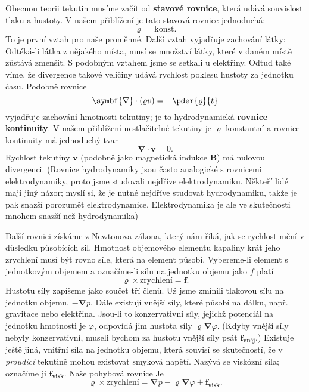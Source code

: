     Obecnou teorii tekutin musíme začít od \textbf{stavové rovnice}, která udává souvislost tlaku a 
    hustoty. V našem přiblížení je tato stavová rovnice jednoduchá:
    \begin{equation*}
      \varrho = \text{konst}.
    \end{equation*}
    To je první vztah pro naše proměnné. Další vztah vyjadřuje zachování látky: Odtéká-li látka z 
    nějakého místa, musí se množství látky, které v daném místě zůstává zmenšit. S podobným vztahem 
    jsme se setkali u elektřiny. Odtud také víme, že divergence takové veličiny udává rychlost 
    poklesu hustoty za jednotku času. Podobně rovnice
    \begin{equation}\label{fyz:eq547}
      \symbf{\nabla}\cdot(\varrho v) = -\pder{\varrho}{t}
    \end{equation}
    vyjadřuje zachování hmotnosti tekutiny; je to hydrodynamická \textbf{rovnice kontinuity}. V 
    našem přiblížení nestlačitelné tekutiny je \(\varrho\) konstantní a rovnice kontinuity má 
    jednoduchý tvar
    \begin{equation}\label{fyz:eq548}
      \symbf{\nabla}\cdot\bm{v} = 0.
    \end{equation}
    Rychlost tekutiny \(\bm{v}\) (podobně jako magnetická indukce \(\bm{B}\)) má nulovou 
    divergenci. (Rovnice hydrodynamiky jsou často analogické s rovnicemi elektrodynamiky, proto 
    jsme studovali nejdříve elektrodynamiku. Někteří lidé mají jiný názor; myslí si, že je nutné 
    nejdříve studovat hydrodynamiku, takže je pak snazší porozumět elektrodynamice. Elektrodynamika 
    je ale ve skutečnosti mnohem snazší než hydrodynamika)
    
    Další rovnici získáme z Newtonova zákona, který nám říká, jak se rychlost mění v důsledku 
    působících sil. Hmotnost objemového elementu kapaliny krát jeho zrychlení musí být rovno síle, 
    která na element působí. Vybereme-li element s jednotkovým objemem a označíme-li sílu na 
    jednotku objemu jako \(f\) platí
    \begin{equation*}
      \varrho\times\text{zrychlení} = \bm{f}.
    \end{equation*}
    Hustotu síly zapíšeme jako součet tří členů. Už jsme zmínili tlakovou sílu na jednotku objemu, 
    \(-\symbf{\nabla}p\). Dále existují vnější síly, které působí na dálku, např. gravitace nebo 
    elektřina. Jsou-li to konzervativní síly, jejichž potenciál na jednotku hmotnosti je 
    \(\varphi\), odpovídá jim hustota síly \(\varrho\symbf{\nabla}\varphi\). (Kdyby vnější síly 
    nebyly konzervativní, museli bychom za hustotu vnější síly psát \(\bm{f_{\text{vněj}}}\).) 
    Existuje ještě jiná, vnitřní síla na jednotku objemu, která souvisí se skutečností, že v 
    \emph{proudící} tekutině mohou existovat smyková napětí. Nazývá se viskózní síla; označíme ji 
    \(\bm{f_{\text{visk}}}\). Naše pohybová rovnice Je
    \begin{equation}\label{fyz:eq549}
      \varrho\times\text{zrychlení} = 
        \symbf{\nabla}p - \varrho\symbf{\nabla}\varphi + \bm{f_{visk}}.
    \end{equation}
    

